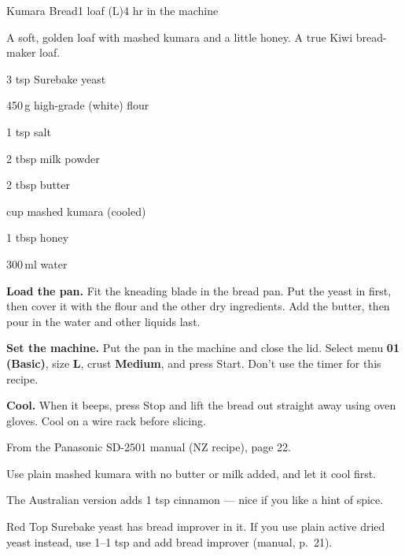 \begin{recipebox}{Kumara Bread}{1 loaf (L)}{4 hr in the machine}

A soft, golden loaf with mashed kumara and a little honey. A true Kiwi bread-maker loaf.

\begin{ingredients}
  \item 3 tsp Surebake yeast
  \item 450\,g high-grade (white) flour
  \item 1 tsp salt
  \item 2 tbsp milk powder
  \item 2 tbsp butter
  \item {} cup mashed kumara (cooled)
  \item 1 tbsp honey
  \item 300\,ml water
\end{ingredients}

\begin{method}
  \item \textbf{Load the pan.} Fit the kneading blade in the bread pan. Put the yeast in first, then cover it with the flour and the other dry ingredients. Add the butter, then pour in the water and other liquids last.
  \item \textbf{Set the machine.} Put the pan in the machine and close the lid. Select menu \textbf{01 (Basic)}, size \textbf{L}, crust \textbf{Medium}, and press Start. Don't use the timer for this recipe.
  \item \textbf{Cool.} When it beeps, press Stop and lift the bread out straight away using oven gloves. Cool on a wire rack before slicing.
\end{method}

\begin{notelist}
  \item From the Panasonic SD-2501 manual (NZ recipe), page 22.
  \item Use plain mashed kumara with no butter or milk added, and let it cool first.
  \item The Australian version adds 1 tsp cinnamon --- nice if you like a hint of spice.
  \item Red Top Surebake yeast has bread improver in it. If you use plain active dried yeast instead, use 1--1 tsp and add bread improver (manual, p.~21).
\end{notelist}

\end{recipebox}
